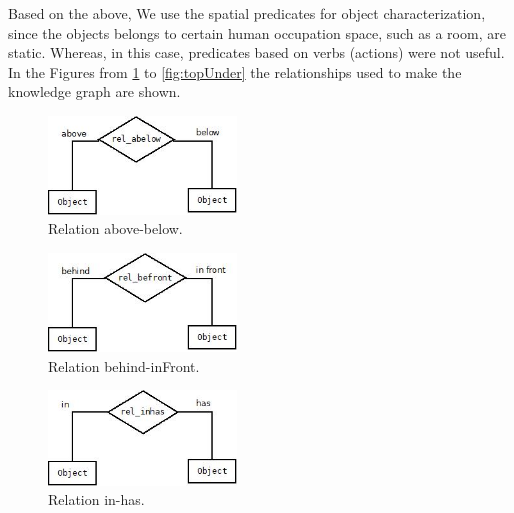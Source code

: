 Based on the above, We use the spatial predicates for object characterization, 
since the objects belongs to certain human occupation space, 
such as a room, are static. Whereas, in this case, 
predicates based on verbs (actions) were not useful. In the Figures from 
\ref{fig:abelow} to \ref{fig:topUnder} the relationships used to make the 
knowledge graph are shown.

\begin{figure}[H]
    \centering
    \includegraphics[width=5cm]{figures/abelow.jpg}
    \caption{Relation above-below.}
    \label{fig:abelow}
\end{figure}

\begin{figure}[H]
    \centering
    \includegraphics[width=5cm]{figures/befront.jpg}
    \caption{Relation behind-inFront.}
    \label{fig:befront}
\end{figure}

\begin{figure}[H]
    \centering
    \includegraphics[width=5cm]{figures/inhas.jpg}
    \caption{Relation in-has.}
    \label{fig:inhas}
\end{figure}

